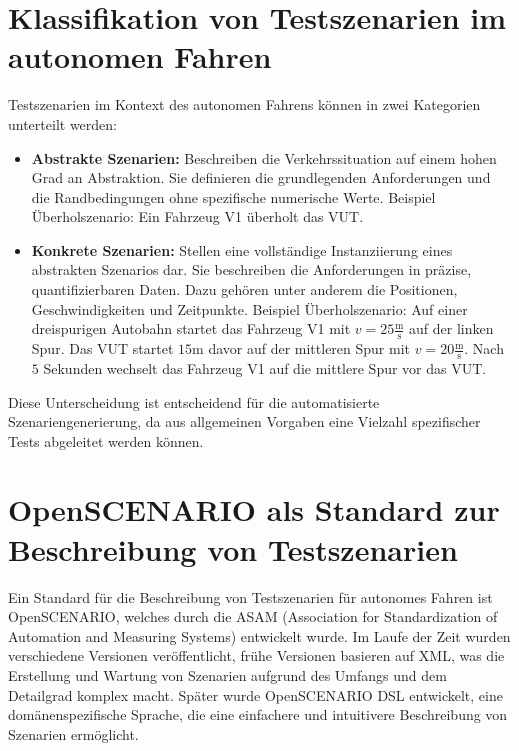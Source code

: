 \section{Klassifikation von Testszenarien im autonomen Fahren}
Testszenarien im Kontext des autonomen Fahrens können in zwei Kategorien unterteilt werden:
\begin{itemize}
    \item \textbf{Abstrakte Szenarien:}
    Beschreiben die Verkehrssituation auf einem hohen Grad an Abstraktion. Sie definieren die grundlegenden Anforderungen und die Randbedingungen ohne spezifische numerische Werte.
    \newline Beispiel Überholszenario: Ein Fahrzeug V1 überholt das VUT.
    \item \textbf{Konkrete Szenarien:}
    Stellen eine vollständige Instanziierung eines abstrakten Szenarios dar. Sie beschreiben die Anforderungen in präzise, quantifizierbaren Daten. Dazu gehören unter anderem die Positionen, Geschwindigkeiten und Zeitpunkte.
    \newline Beispiel Überholszenario: Auf einer dreispurigen Autobahn startet das Fahrzeug V1 mit $v = 25 \frac{\text{m}}{\text{s}}$ auf der linken Spur. Das VUT startet $15 \text{m}$ davor auf der mittleren Spur mit $v = 20 \frac{\text{m}}{\text{s}}$. Nach $5$ Sekunden wechselt das Fahrzeug V1 auf die mittlere Spur vor das VUT.
\end{itemize}
Diese Unterscheidung ist entscheidend für die automatisierte Szenariengenerierung, da aus allgemeinen Vorgaben eine Vielzahl spezifischer Tests abgeleitet werden können.

\section{OpenSCENARIO als Standard zur Beschreibung von Testszenarien}



Ein Standard für die Beschreibung von Testszenarien für autonomes Fahren ist OpenSCENARIO, welches durch die ASAM (Association for Standardization of Automation and Measuring Systems) entwickelt wurde.
Im Laufe der Zeit wurden verschiedene Versionen veröffentlicht, frühe Versionen basieren auf XML, was die Erstellung und Wartung von Szenarien aufgrund des Umfangs und dem Detailgrad komplex macht.
Später wurde OpenSCENARIO DSL entwickelt, eine domänenspezifische Sprache, die eine einfachere und intuitivere Beschreibung von Szenarien ermöglicht.

